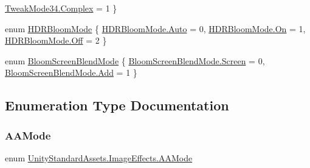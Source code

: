 \begin{DoxyCompactItemize}
\mbox{\hyperlink{namespace_unity_standard_assets_1_1_image_effects_aad04ccb197e6c2c9f40afbbc5f387460a10b4eb76294b70d7fd6df997ff06edb1}{Tweak\+Mode34.\+Complex}} = 1
 \}
\item 
enum \mbox{\hyperlink{namespace_unity_standard_assets_1_1_image_effects_a80dad9689d9811c8715cc09830fc8b1d}{H\+D\+R\+Bloom\+Mode}} \{ \mbox{\hyperlink{namespace_unity_standard_assets_1_1_image_effects_a80dad9689d9811c8715cc09830fc8b1da06b9281e396db002010bde1de57262eb}{H\+D\+R\+Bloom\+Mode.\+Auto}} = 0, 
\mbox{\hyperlink{namespace_unity_standard_assets_1_1_image_effects_a80dad9689d9811c8715cc09830fc8b1da521c36a31c2762741cf0f8890cbe05e3}{H\+D\+R\+Bloom\+Mode.\+On}} = 1, 
\mbox{\hyperlink{namespace_unity_standard_assets_1_1_image_effects_a80dad9689d9811c8715cc09830fc8b1dad15305d7a4e34e02489c74a5ef542f36}{H\+D\+R\+Bloom\+Mode.\+Off}} = 2
 \}
\item 
enum \mbox{\hyperlink{namespace_unity_standard_assets_1_1_image_effects_a02785e2abb5d4a7cd6d77453b2298730}{Bloom\+Screen\+Blend\+Mode}} \{ \mbox{\hyperlink{namespace_unity_standard_assets_1_1_image_effects_a02785e2abb5d4a7cd6d77453b2298730a2fc3359e12b2a9104121dcf04246f6a0}{Bloom\+Screen\+Blend\+Mode.\+Screen}} = 0, 
\mbox{\hyperlink{namespace_unity_standard_assets_1_1_image_effects_a02785e2abb5d4a7cd6d77453b2298730aec211f7c20af43e742bf2570c3cb84f9}{Bloom\+Screen\+Blend\+Mode.\+Add}} = 1
 \}
\end{DoxyCompactItemize}


\subsection{Enumeration Type Documentation}
\mbox{\label{namespace_unity_standard_assets_1_1_image_effects_a158625add19c62e52c685a8700b4cd99}} 
\subsubsection{\texorpdfstring{A\+A\+Mode}{AAMode}}
{\footnotesize\ttfamily enum \mbox{\hyperlink{namespace_unity_standard_assets_1_1_image_effects_a158625add19c62e52c685a8700b4cd99}{Unity\+Standard\+Assets.\+Image\+Effects.\+A\+A\+Mode}}\hspace{0.3cm}{\ttfamily [strong]}}

